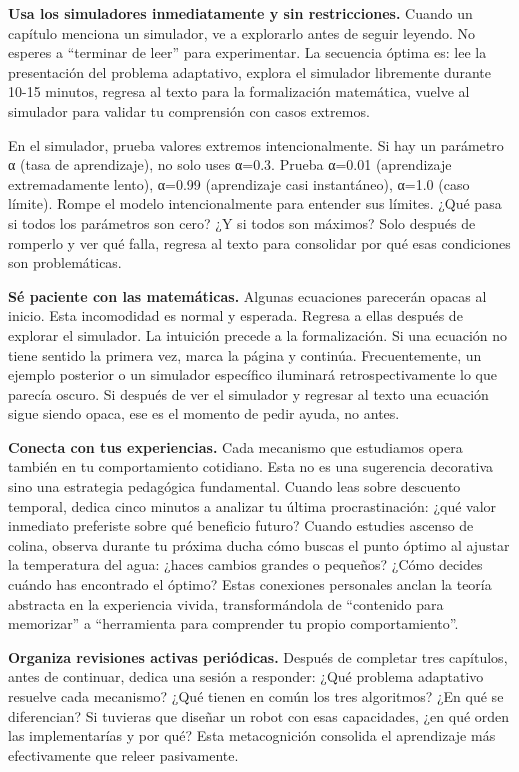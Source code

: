 \documentclass[
  letterpaper,
  DIV=11,
  numbers=noendperiod]{scrreprt}
\begin{document}
\textbf{Usa los simuladores inmediatamente y sin restricciones.} Cuando
un capítulo menciona un simulador, ve a explorarlo antes de seguir
leyendo. No esperes a ``terminar de leer'' para experimentar. La
secuencia óptima es: lee la presentación del problema adaptativo,
explora el simulador libremente durante 10-15 minutos, regresa al texto
para la formalización matemática, vuelve al simulador para validar tu
comprensión con casos extremos.

En el simulador, prueba valores extremos intencionalmente. Si hay un
parámetro α (tasa de aprendizaje), no solo uses α=0.3. Prueba α=0.01
(aprendizaje extremadamente lento), α=0.99 (aprendizaje casi
instantáneo), α=1.0 (caso límite). Rompe el modelo intencionalmente para
entender sus límites. ¿Qué pasa si todos los parámetros son cero? ¿Y si
todos son máximos? Solo después de romperlo y ver qué falla, regresa al
texto para consolidar por qué esas condiciones son problemáticas.

\textbf{Sé paciente con las matemáticas.} Algunas ecuaciones parecerán
opacas al inicio. Esta incomodidad es normal y esperada. Regresa a ellas
después de explorar el simulador. La intuición precede a la
formalización. Si una ecuación no tiene sentido la primera vez, marca la
página y continúa. Frecuentemente, un ejemplo posterior o un simulador
específico iluminará retrospectivamente lo que parecía oscuro. Si
después de ver el simulador y regresar al texto una ecuación sigue
siendo opaca, ese es el momento de pedir ayuda, no antes.

\textbf{Conecta con tus experiencias.} Cada mecanismo que estudiamos
opera también en tu comportamiento cotidiano. Esta no es una sugerencia
decorativa sino una estrategia pedagógica fundamental. Cuando leas sobre
descuento temporal, dedica cinco minutos a analizar tu última
procrastinación: ¿qué valor inmediato preferiste sobre qué beneficio
futuro? Cuando estudies ascenso de colina, observa durante tu próxima
ducha cómo buscas el punto óptimo al ajustar la temperatura del agua:
¿haces cambios grandes o pequeños? ¿Cómo decides cuándo has encontrado
el óptimo? Estas conexiones personales anclan la teoría abstracta en la
experiencia vivida, transformándola de ``contenido para memorizar'' a
``herramienta para comprender tu propio comportamiento''.

\textbf{Organiza revisiones activas periódicas.} Después de completar
tres capítulos, antes de continuar, dedica una sesión a responder: ¿Qué
problema adaptativo resuelve cada mecanismo? ¿Qué tienen en común los
tres algoritmos? ¿En qué se diferencian? Si tuvieras que diseñar un
robot con esas capacidades, ¿en qué orden las implementarías y por qué?
Esta metacognición consolida el aprendizaje más efectivamente que releer
pasivamente.
\end{document}
